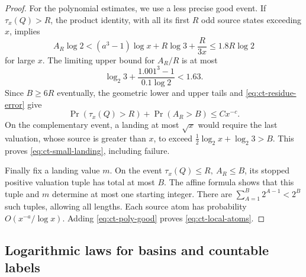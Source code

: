 \begin{proof}
For the polynomial estimates, we use a less precise good event.
If \(\tau_x(Q)>R\), the product identity, with all its first \(R\)
odd source states exceeding \(x\), implies
\[
 A_R\log2
 <(a^3-1)\log x+R\log3+\frac{R}{3x}
 \le1.8R\log2
\]
for large \(x\). The limiting upper bound for \(A_R/R\) is at most
\[
 \log_2 3+\frac{1.001^3-1}{0.1\log2}<1.63.
\]
Since \(B\ge6R\) eventually, the geometric lower and upper tails
and \eqref{eq:ct-residue-error} give
\begin{equation}\label{eq:ct-poly-good}
 \Pr(\tau_x(Q)>R)+\Pr(A_R>B)\le Cx^{-c}.
\end{equation}
On the complementary event, a landing at most \(\sqrt x\) would
require the last valuation, whose source is greater than \(x\),
to exceed \(\frac12\log_2x+\log_2 3>B\). This proves
\eqref{eq:ct-small-landing}, including failure.

Finally fix a landing value \(m\). On the event
\(\tau_x(Q)\le R,\ A_R\le B\), its stopped positive valuation
tuple has total at most \(B\). The affine formula shows that this
tuple and \(m\) determine at most one starting integer.
There are \(\sum_{A=1}^B2^{A-1}<2^B\) such tuples, allowing all
lengths. Each source atom has probability
\(O(x^{-a}/\log x)\). Adding \eqref{eq:ct-poly-good} proves
\eqref{eq:ct-local-atoms}.
\end{proof}

\subsection{Logarithmic laws for basins and countable labels}

